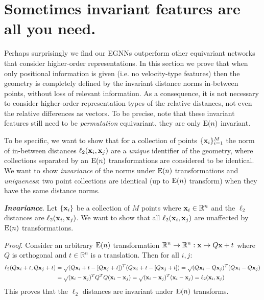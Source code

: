 \newpage
\section{Sometimes invariant features are all you need.} \label{appendix:invariant_features} 
Perhaps surprisingly we find our EGNNs outperform other equivariant networks that consider higher-order representations. In this section we prove that when only positional information is given (i.e. no velocity-type features) then the geometry is completely defined by the invariant distance norms in-between points, without loss of relevant information. As a consequence, it is not necessary to consider higher-order representation types of the relative distances, not even the relative differences as vectors. To be precise, note that these invariant features still need to be \textit{permutation} equivariant, they are only $\mathrm{E}(n)$ invariant.

To be specific, we want to show that for a collection of points $\{\mathbf{x}_i\}_{i=1}^M$ the norm of in-between distances $\ell_2(\mathbf{x}_i, \mathbf{x}_j)$ are a \textit{unique} identifier of the geometry, where collections separated by an $\mathrm{E}(n)$ transformations are considered to be identical. We want to show \textit{invariance} of the norms under $\mathrm{E}(n)$ transformations and \textit{uniqueness}: two point collections are identical (up to $\mathrm{E}(n)$ transform) when they have the same distance norms.

\textbf{\textit{Invariance}}. Let $\{\mathbf{x}_i\}$ be a collection of $M$ points where $\mathbf{x}_i \in \mathbb{R}^n$ and the $\ell_2$ distances are $\ell_2(\mathbf{x}_i, \mathbf{x}_j)$. We want to show that all $\ell_2(\mathbf{x}_i, \mathbf{x}_j)$ are unaffected by $\mathrm{E}(n)$ transformations.

\textit{Proof}. Consider an arbitrary $\mathrm{E}(n)$ transformation $\mathbb{R}^n \to \mathbb{R}^n : \mathbf{x} \mapsto Q\mathbf{x} + t$ where $Q$ is orthogonal and $t \in \mathbb{R}^n$ is a translation. Then for all $i, j$: \vspace{-.2cm}
\small\begin{align*}
    \ell_2(Q\mathbf{x}_i + t, Q\mathbf{x}_j + t) &= \sqrt{} (Q\mathbf{x}_i + t - [Q\mathbf{x}_j + t])^T(Q\mathbf{x}_i + t - [Q\mathbf{x}_j + t]) = \sqrt{} (Q\mathbf{x}_i - Q\mathbf{x}_j)^T(Q\mathbf{x}_i - Q\mathbf{x}_j) \\
    &= \sqrt{} (\mathbf{x}_i - \mathbf{x}_j)^T Q^T Q (\mathbf{x}_i - \mathbf{x}_j) = \sqrt{} (\mathbf{x}_i - \mathbf{x}_j)^T (\mathbf{x}_i - \mathbf{x}_j) = \ell_2(\mathbf{x}_i, \mathbf{x}_j)
\end{align*}
\normalsize
This proves that the $\ell_2$ distances are invariant under $\mathrm{E}(n)$ transforms.

